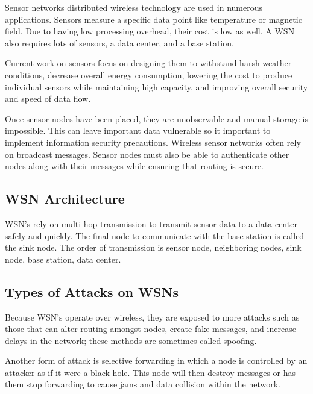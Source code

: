 Sensor networks distributed wireless technology are used in numerous applications. Sensors measure a specific data point like temperature or magnetic field. Due to having low processing overhead, their cost is low as well. A WSN also requires lots of sensors, a data center, and a base station.

\smallskip

Current work on sensors focus on designing them to withstand harsh weather conditions, decrease overall energy consumption, lowering the cost to produce individual sensors while maintaining high capacity, and improving overall security and speed of data flow.

\smallskip

Once sensor nodes have been placed, they are unobservable and manual storage is impossible. This can leave important data vulnerable so it important to implement information security precautions. Wireless sensor networks often rely on broadcast messages. Sensor nodes must also be able to authenticate other nodes along with their messages while ensuring that routing is secure. 

\subsection {WSN Architecture}

WSN’s rely on multi-hop transmission to transmit sensor data to a data center safely and quickly. The final node to communicate with the base station is called the sink node. The order of transmission is sensor node, neighboring nodes, sink node, base station, data center.

\subsection {Types of Attacks on WSNs}

Because WSN’s operate over wireless, they are exposed to more attacks such as those that can alter routing amongst nodes, create fake messages, and increase delays in the network; these methods are sometimes called spoofing.

\smallskip

Another form of attack is selective forwarding in which a node is controlled by an attacker as if it were a black hole. This node will then destroy messages or has them stop forwarding to cause jams and data collision within the network.

